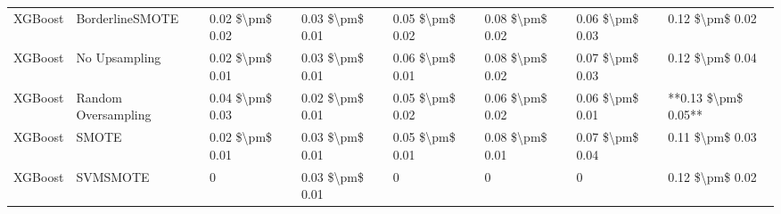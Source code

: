 \begin{tabular}{llllllll}
                        XGBoost &               BorderlineSMOTE & 0.02 \$\textbackslash pm\$ 0.02 &           0.03 \$\textbackslash pm\$ 0.01 &       0.05 \$\textbackslash pm\$ 0.02 &        0.08 \$\textbackslash pm\$ 0.02 &                         0.06 \$\textbackslash pm\$ 0.03 &     0.12 \$\textbackslash pm\$ 0.02 \\
                        XGBoost &                 No Upsampling & 0.02 \$\textbackslash pm\$ 0.01 &           0.03 \$\textbackslash pm\$ 0.01 &       0.06 \$\textbackslash pm\$ 0.01 &        0.08 \$\textbackslash pm\$ 0.02 &                         0.07 \$\textbackslash pm\$ 0.03 &     0.12 \$\textbackslash pm\$ 0.04 \\
                        XGBoost &           Random Oversampling & 0.04 \$\textbackslash pm\$ 0.03 &           0.02 \$\textbackslash pm\$ 0.01 &       0.05 \$\textbackslash pm\$ 0.02 &        0.06 \$\textbackslash pm\$ 0.02 &                         0.06 \$\textbackslash pm\$ 0.01 & **0.13 \$\textbackslash pm\$ 0.05** \\
                        XGBoost &                         SMOTE & 0.02 \$\textbackslash pm\$ 0.01 &           0.03 \$\textbackslash pm\$ 0.01 &       0.05 \$\textbackslash pm\$ 0.01 &        0.08 \$\textbackslash pm\$ 0.01 &                         0.07 \$\textbackslash pm\$ 0.04 &     0.11 \$\textbackslash pm\$ 0.03 \\
                        XGBoost &                      SVMSMOTE &               0 &           0.03 \$\textbackslash pm\$ 0.01 &                     0 &                      0 &                                       0 &     0.12 \$\textbackslash pm\$ 0.02 \\
\bottomrule
\end{tabular}

